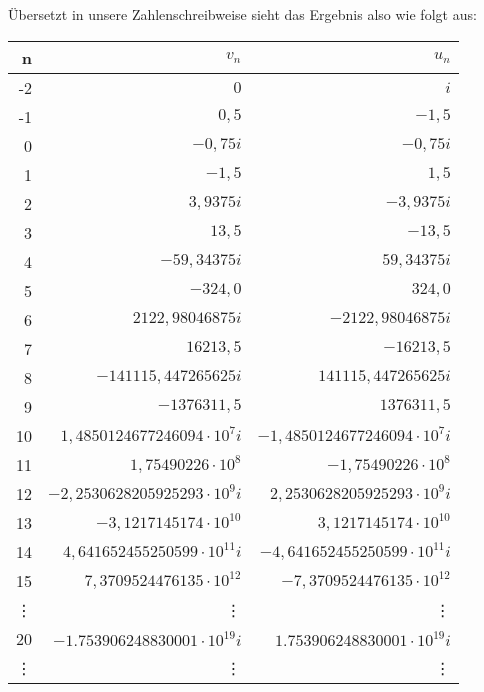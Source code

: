 Übersetzt in unsere Zahlenschreibweise sieht das Ergebnis also wie folgt aus:
\begin{center} \scriptsize
\begin{tabular}{|r||r|r|}
\hline
n        & $v_n$                             & $u_n$
\\\hline\hline
-2       & $0$                               & $i$
\\-1     & $0,5$                             & $-1,5 $
\\0      & $-0,75i$                          & $-0,75i$
\\1      & $-1,5$                            & $1,5$
\\2      & $3,9375i$                         & $-3,9375i$
\\3      & $13,5$                            & $-13,5$
\\4      & $-59,34375i$                      & $59,34375i$
\\5      & $-324,0$                          & $324,0$
\\6      & $2122,98046875i$                  & $-2122,98046875i$
\\7      & $16213,5$                         & $-16213,5$
\\8      & $-141115,447265625i$              & $141115,447265625i$
\\9      & $-1376311,5$                      & $1376311,5$
\\10     & $1,4850124677246094\cdot10^7i$    & $-1,4850124677246094\cdot10^7i$
\\11     & $1,75490226\cdot10^8$             & $-1,75490226\cdot10^8$
\\12     & $-2,2530628205925293\cdot10^9i$   & $2,2530628205925293\cdot10^9i$
\\13     & $-3,1217145174\cdot10^{10}$       & $3,1217145174\cdot10^{10}$
\\14     & $4,641652455250599\cdot10^{11}i$  & $-4,641652455250599\cdot10^{11}i$
\\15     & $7,3709524476135\cdot10^{12}$     & $-7,3709524476135\cdot10^{12}$
\\\vdots & \vdots                            & \vdots
\\20     & $-1.753906248830001\cdot10^{19}i$ & $1.753906248830001\cdot10^{19}i$
\\\vdots & \vdots                            & \vdots
\\ \hline
\end{tabular}
\end{center}


